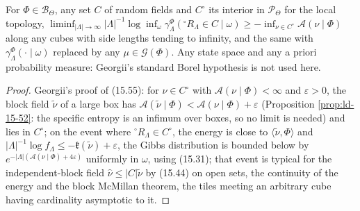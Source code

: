 \begin{theorem}
    \label{thm:ld-15-47}
    \leanok

    For $\Phi \in \mathcal B_\Theta$, any set $C$ of random fields and $C^\circ$ its interior in
    $\mathcal P_\Theta$ for the local topology,
    $\liminf_{|\Lambda|\to\infty} |\Lambda|^{-1}\log\inf_\omega\gamma^\Phi_\Lambda({}^\circ R_\Lambda \in C \mid \omega)
    \geq -\inf_{\nu \in C^\circ}\mathcal A(\nu\mid\Phi)$ along any cubes with side lengths tending
    to infinity, and the same with $\gamma^\Phi_\Lambda(\cdot\mid\omega)$ replaced by any
    $\mu \in \mathcal G(\Phi)$. Any state space and any a priori probability measure: Georgii's
    standard Borel hypothesis is not used here.
\end{theorem}
\begin{proof}
    \leanok
    Georgii's proof of (15.55): for $\nu \in C^\circ$ with $\mathcal A(\nu\mid\Phi) < \infty$ and
    $\varepsilon > 0$, the block field $\tilde\nu$ of a large box has $\mathcal A(\tilde\nu\mid\Phi)
    < \mathcal A(\nu\mid\Phi) + \varepsilon$ (Proposition \ref{prop:ld-15-52}: the specific entropy is
    an infimum over boxes, so no limit is needed) and lies in $C^\circ$; on the event where
    ${}^\circ R_\Lambda \in C^\circ$, the energy is close to $\langle\tilde\nu,\Phi\rangle$ and
    $|\Lambda|^{-1}\log f_\Lambda \leq -\mathfrak k(\tilde\nu) + \varepsilon$, the Gibbs
    distribution is bounded below by $e^{-|\Lambda|(\mathcal A(\nu\mid\Phi) + 4\varepsilon)}$
    uniformly in $\omega$, using (15.31); that event is typical for the independent-block field
    $\hat\nu \leq |C|\tilde\nu$ by (15.44) on open sets, the continuity of the energy and the block
    McMillan theorem, the tiles meeting an arbitrary cube having cardinality asymptotic to it.
\end{proof}


